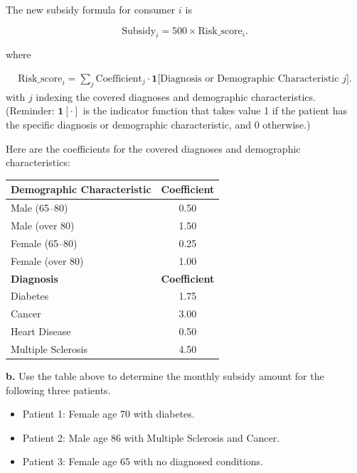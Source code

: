 \documentclass[12pt]{article}
\begin{document}
The new subsidy formula for consumer $i$ is

\begin{equation*}
\text{Subsidy}_i = 500 \times \text{Risk\_score}_i.
\end{equation*}

where

\begin{align*}
\text{Risk\_score}_i 
= \sum_j \text{Coefficient}_j \cdot 
\mathbf{1}\big[\text{Diagnosis or Demographic Characteristic } j\big].
\end{align*}
with $j$ indexing the covered diagnoses and demographic characteristics.\\
(Reminder: $\mathbf{1}[\cdot]$ is the indicator function that takes value 1
if the patient has the specific diagnosis or demographic characteristic, and 0 otherwise.)

\vspace{2mm}

Here are the coefficients for the covered diagnoses and demographic characteristics:
\begin{center}
\begin{tabular}{l c}
\toprule
\textbf{Demographic Characteristic} & \textbf{Coefficient} \\
\midrule
Male (65--80) & 0.50 \\
Male (over 80) & 1.50 \\
Female (65--80) & 0.25 \\
Female (over 80) & 1.00 \\
\midrule
\textbf{Diagnosis} & \textbf{Coefficient} \\
\midrule
Diabetes & 1.75 \\
Cancer & 3.00 \\
Heart Disease & 0.50 \\
Multiple Sclerosis & 4.50 \\
\bottomrule
\end{tabular}
\end{center}

\bigskip
\noindent\textbf{b.} Use the table above to determine the monthly subsidy amount for the following three patients.

\begin{itemize}
\item[-] Patient 1: Female age 70 with diabetes.
\item[-] Patient 2: Male age 86 with Multiple Sclerosis and Cancer.
\item[-] Patient 3: Female age 65 with no diagnosed conditions.
\end{itemize}
\end{document}
